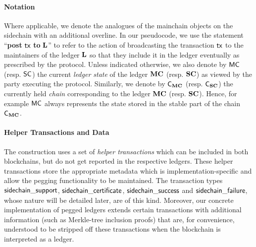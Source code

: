 \paragraph{Notation}
Where applicable, we denote the analogues of the mainchain objects on the
sidechain with an additional overline.
%
In our pseudocode, we use the statement
``\textbf{post} $\mathsf{tx}$ \textbf{to} $\mathbf{L}$''
to refer to the
action of broadcasting the transaction $\mathsf{tx}$ to the maintainers of the ledger
$\mathbf{L}$ so that they include it in the ledger eventually as prescribed by the
protocol.
Unless indicated otherwise, we also denote by $\mathsf{MC}$ (resp.
$\mathsf{SC}$) the current \emph{ledger state} of the ledger $\mathbf{MC}$ (resp. $\mathbf{SC}$) as
viewed by the party executing the protocol. Similarly, we denote by $\mathsf{C_{\mathbf{MC}}}$
(resp. $\mathsf{C_{\mathbf{SC}}}$) the currently held \emph{chain} corresponding to the ledger
$\mathbf{MC}$ (resp. $\mathbf{SC}$). Hence, for example $\mathsf{MC}$ always represents the state
stored in the stable part of the chain $\mathsf{C_{\mathbf{MC}}}$.

\paragraph{Helper Transactions and Data}
The construction uses a set of \textit{helper transactions}
which can be included in both blockchains, but do not get reported
in the respective ledgers. These helper transactions store the appropriate
metadata which is implementation-specific and allow the pegging functionality to be
maintained. The transaction types $\mathsf{side}\-\mathsf{chain\_support}$,
$\mathsf{side}\-\mathsf{chain\_certificate}$,
$\mathsf{side}\-\mathsf{chain\_success}$ and
$\mathsf{side}\-\mathsf{chain\_fai}\-\mathsf{lure}$, whose nature will be
detailed later, are of this kind.
Moreover, our concrete implementation of pegged ledgers extends certain
transactions with additional information (such as Merkle-tree inclusion proofs)
that are, for convenience, understood to be stripped off these transactions when
the blockchain is interpreted as a ledger.

